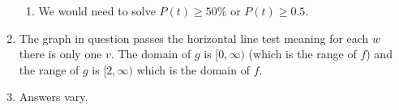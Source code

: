 \documentclass{ximera}
\begin{document}
\begin{enumerate}
\begin{enumerate}
\item  We would need to solve $P(t) \geq 50 \%$ or $P(t) \geq 0.5$.

\end{enumerate}


\item The graph in question passes the horizontal line test meaning for each $w$ there is only one $v$.    The domain of $g$ is $[0, \infty)$ (which is the range of $f$) and the range of $g$ is $[2, \infty)$ which is the domain of $f$.  

\item  Answers vary.  

\end{enumerate}
\end{document}
